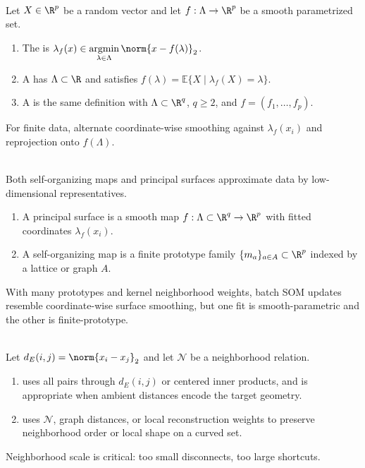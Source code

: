 \begin{definition} \label{def:sl-principal-curves-and-surfaces} \\
Let $X\in\R^p$ be a random vector and let $f:\Lambda\to\R^p$ be a smooth parametrized set.
\begin{enumerate}[label=(\roman*)]
\setlength{\itemsep}{0pt}
\item The  is $\lambda_f(x)\in\operatorname*{argmin}\limits_{\lambda\in\Lambda}\norm{x-f(\lambda)}_2$.
\item A  has $\Lambda\subset\R$ and satisfies $f(\lambda)=\mathbb{E}\{X\mid \lambda_f(X)=\lambda\}$.
\item A  is the same definition with $\Lambda\subset\R^q$, $q\geq2$, and $f=(f_1,\ldots,f_p)$.
\end{enumerate}
For finite data, alternate coordinate-wise smoothing against $\lambda_f(x_i)$ and reprojection onto $f(\Lambda)$.
\end{definition}

\begin{remark} \label{rem:sl-som-versus-principal-surfaces} \\
Both self-organizing maps and principal surfaces approximate data by low-dimensional representatives.
\begin{enumerate}[label=(\roman*)]
\setlength{\itemsep}{0pt}
\item A principal surface is a smooth map $f:\Lambda\subset\R^q\to\R^p$ with fitted coordinates $\lambda_f(x_i)$.
\item A self-organizing map is a finite prototype family $\{m_a\}_{a\in A}\subset\R^p$ indexed by a lattice or graph $A$.
\end{enumerate}
With many prototypes and kernel neighborhood weights, batch SOM updates resemble coordinate-wise surface smoothing, but one fit is smooth-parametric and the other is finite-prototype.
\end{remark}

\begin{remark} \label{rem:sl-local-versus-global-scaling} \\
Let $d_E(i,j)=\norm{x_i-x_j}_2$ and let $\mathcal{N}$ be a neighborhood relation.
\begin{enumerate}[label=(\roman*)]
\setlength{\itemsep}{0pt}
\item {} uses all pairs through $d_E(i,j)$ or centered inner products, and is appropriate when ambient distances encode the target geometry.
\item {} uses $\mathcal{N}$, graph distances, or local reconstruction weights to preserve neighborhood order or local shape on a curved set.
\end{enumerate}
Neighborhood scale is critical: too small disconnects, too large shortcuts.
\end{remark}
